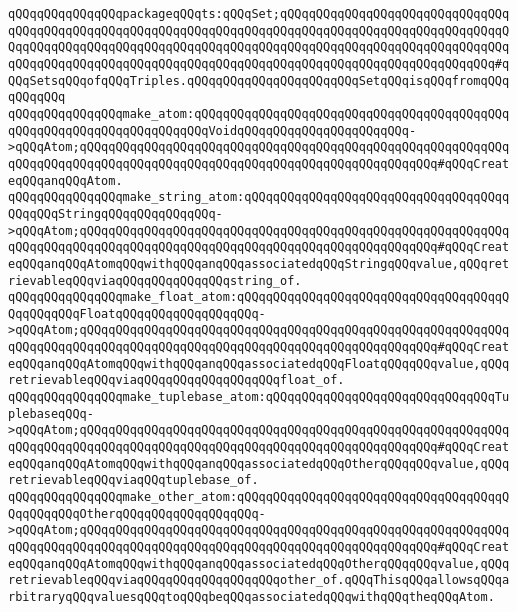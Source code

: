 \verb|qQQqqQQqqQQqqQQqpackageqQQqts:qQQqSet;qQQqqQQqqQQqqQQqqQQqqQQqqQQqqQQqqQQqqQQqqQQqqQQqqQQqqQQqqQQqqQQqqQQqqQQqqQQqqQQqqQQqqQQqqQQqqQQqqQQqqQQqqQQqqQQqqQQqqQQqqQQqqQQqqQQqqQQqqQQqqQQqqQQqqQQqqQQqqQQqqQQqqQQqqQQqqQQqqQQqqQQqqQQqqQQqqQQqqQQqqQQqqQQqqQQqqQQqqQQqqQQqqQQqqQQqqQQqqQQq#qQQqSetsqQQqofqQQqTriples.qQQqqQQqqQQqqQQqqQQqqQQqSetqQQqisqQQqfromqQQqqQQqqQQq|\newline
\newline
\verb|qQQqqQQqqQQqqQQqmake_atom:qQQqqQQqqQQqqQQqqQQqqQQqqQQqqQQqqQQqqQQqqQQqqQQqqQQqqQQqqQQqqQQqqQQqqQQqVoidqQQqqQQqqQQqqQQqqQQqqQQq->qQQqAtom;qQQqqQQqqQQqqQQqqQQqqQQqqQQqqQQqqQQqqQQqqQQqqQQqqQQqqQQqqQQqqQQqqQQqqQQqqQQqqQQqqQQqqQQqqQQqqQQqqQQqqQQqqQQqqQQqqQQqqQQq#qQQqCreateqQQqanqQQqAtom.|\newline
\verb|qQQqqQQqqQQqqQQqmake_string_atom:qQQqqQQqqQQqqQQqqQQqqQQqqQQqqQQqqQQqqQQqqQQqStringqQQqqQQqqQQqqQQq->qQQqAtom;qQQqqQQqqQQqqQQqqQQqqQQqqQQqqQQqqQQqqQQqqQQqqQQqqQQqqQQqqQQqqQQqqQQqqQQqqQQqqQQqqQQqqQQqqQQqqQQqqQQqqQQqqQQqqQQqqQQqqQQq#qQQqCreateqQQqanqQQqAtomqQQqwithqQQqanqQQqassociatedqQQqStringqQQqvalue,qQQqretrievableqQQqviaqQQqqQQqqQQqqQQqstring_of.|\newline
\verb|qQQqqQQqqQQqqQQqmake_float_atom:qQQqqQQqqQQqqQQqqQQqqQQqqQQqqQQqqQQqqQQqqQQqqQQqFloatqQQqqQQqqQQqqQQqqQQq->qQQqAtom;qQQqqQQqqQQqqQQqqQQqqQQqqQQqqQQqqQQqqQQqqQQqqQQqqQQqqQQqqQQqqQQqqQQqqQQqqQQqqQQqqQQqqQQqqQQqqQQqqQQqqQQqqQQqqQQqqQQqqQQq#qQQqCreateqQQqanqQQqAtomqQQqwithqQQqanqQQqassociatedqQQqFloatqQQqqQQqvalue,qQQqretrievableqQQqviaqQQqqQQqqQQqqQQqqQQqfloat_of.|\newline
\verb|qQQqqQQqqQQqqQQqmake_tuplebase_atom:qQQqqQQqqQQqqQQqqQQqqQQqqQQqqQQqTuplebaseqQQq->qQQqAtom;qQQqqQQqqQQqqQQqqQQqqQQqqQQqqQQqqQQqqQQqqQQqqQQqqQQqqQQqqQQqqQQqqQQqqQQqqQQqqQQqqQQqqQQqqQQqqQQqqQQqqQQqqQQqqQQqqQQqqQQq#qQQqCreateqQQqanqQQqAtomqQQqwithqQQqanqQQqassociatedqQQqOtherqQQqqQQqvalue,qQQqretrievableqQQqviaqQQqtuplebase_of.|\newline
\verb|qQQqqQQqqQQqqQQqmake_other_atom:qQQqqQQqqQQqqQQqqQQqqQQqqQQqqQQqqQQqqQQqqQQqqQQqOtherqQQqqQQqqQQqqQQqqQQq->qQQqAtom;qQQqqQQqqQQqqQQqqQQqqQQqqQQqqQQqqQQqqQQqqQQqqQQqqQQqqQQqqQQqqQQqqQQqqQQqqQQqqQQqqQQqqQQqqQQqqQQqqQQqqQQqqQQqqQQqqQQqqQQq#qQQqCreateqQQqanqQQqAtomqQQqwithqQQqanqQQqassociatedqQQqOtherqQQqqQQqvalue,qQQqretrievableqQQqviaqQQqqQQqqQQqqQQqqQQqother_of.qQQqThisqQQqallowsqQQqarbitraryqQQqvaluesqQQqtoqQQqbeqQQqassociatedqQQqwithqQQqtheqQQqAtom.|\newline
\newline
